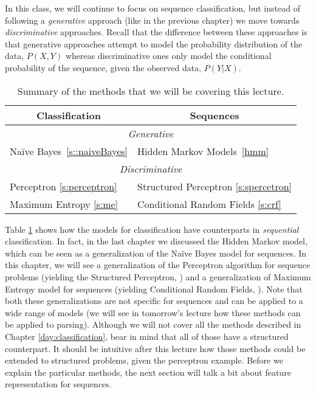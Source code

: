 In this class, we will continue to focus on sequence classification,
but instead of following a \emph{generative} approach (like in the previous
chapter) we move towards \emph{discriminative} approaches. Recall that the difference between these approaches is that generative approaches attempt to model the probability distribution of the data, $P(X,Y)$ whereas discriminative ones only model the conditional probability of the sequence, given the observed data, $P(Y|X)$.

\begin{table}
\centering
\begin{tabular}{|l|l|}
\hline

\multicolumn{1}{|c|}{\textbf{Classification}} & \multicolumn{1}{|c|}{\textbf{Sequences}} \\
\hline
\multicolumn{2}{|c|}{\emph{Generative}}\\
\hline
Na\"{i}ve Bayes~\ref{s::naiveBayes} & Hidden Markov Models~\ref{hmm} \\
\hline
\multicolumn{2}{|c|}{\emph{Discriminative}}\\
\hline
Perceptron \ref{s:perceptron} & Structured Perceptron \ref{s:spercetron}\\
\hline
Maximum Entropy \ref{s:me} & Conditional Random Fields \ref{s:crf}\\
\hline
\end{tabular}
\caption{\label{disc_seq_summary}Summary of the methods that we will be covering this lecture.}
\end{table}

Table \ref{disc_seq_summary} shows how the models for classification 
have counterparts in \emph{sequential} classification. In fact, in
the last chapter we discussed the Hidden Markov model, which can be seen as a
generalization of the Na\"{i}ve Bayes model for sequences. 
In this chapter, we will see a generalization of the
Perceptron algorithm for sequence problems (yielding the Structured
Perceptron, \citealt{collins2002discriminative}) and a generalization of
Maximum Entropy model for sequences (yielding Conditional Random Fields, \citealt{lafferty2001conditional}). 
Note that both these generalizations are  not specific for sequences
and can be applied to a wide range of models (we will see in tomorrow's
lecture how these methods can be applied to parsing).
Although we will not cover all the methods described in
Chapter \ref{day:classification}, bear in mind that all of those have a structured counterpart. 
It should be intuitive after this lecture how those methods could be
extended to structured problems, given the perceptron example.
Before we explain the particular methods, the next section will talk a
bit about feature representation for sequences. 

